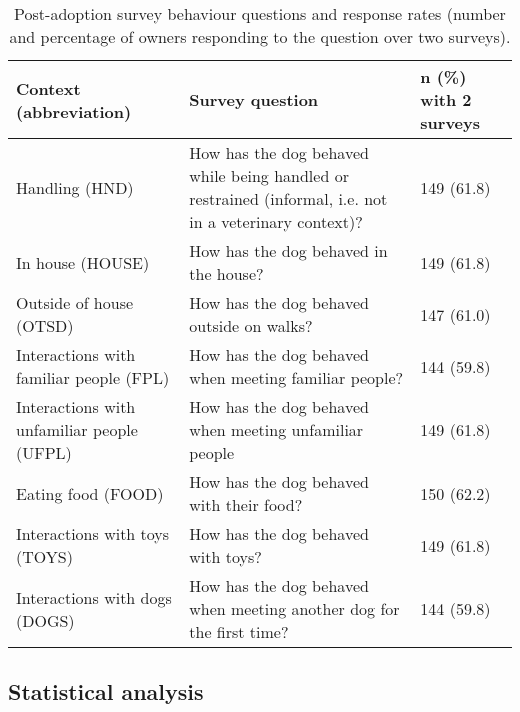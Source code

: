 \documentclass[fleqn,10pt]{wlscirep}
\begin{document}
\begin{table}[t!]
  \centering
  \begin{tabular}{p{6cm}p{6cm}p{5cm}}
    \textbf{Context (abbreviation)} & \textbf{Survey question} & \textbf{$\boldsymbol{n}$ (\%) with 2 surveys}\\ \hline
    Handling (HND) & \footnotesize{How has the dog behaved while being handled or restrained (informal, i.e. not in a veterinary context)?} & 149 (61.8)\\
    In house (HOUSE) & \footnotesize{How has the dog behaved in the house?} & 149 (61.8)\\
    Outside of house (OTSD) & \footnotesize{How has the dog behaved outside on walks?} & 147 (61.0)\\
    Interactions with familiar people (FPL) & \footnotesize{How has the dog behaved when meeting familiar people?} & 144 (59.8)\\
    Interactions with unfamiliar people (UFPL) & \footnotesize{How has the dog behaved when meeting unfamiliar people} & 149 (61.8)\\
    Eating food (FOOD) & \footnotesize{How has the dog behaved with their food?} & 150 (62.2)\\
    Interactions with toys (TOYS) & \footnotesize{How has the dog behaved with toys?} & 149 (61.8)\\
    Interactions with dogs (DOGS) & \footnotesize{How has the dog behaved when meeting another dog for the first time?} & 144 (59.8)\\
    \hline
  \end{tabular}
  \caption{Post-adoption survey behaviour questions and response rates (number and percentage of owners responding to the question over two surveys).}
  \label{table_postadoptq}
\end{table}

\subsection*{Statistical analysis}
\end{document}
